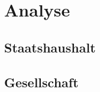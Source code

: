 \documentclass[../main.tex]{subfiles}
\begin{document}
	\section{Analyse}
	
	\subsection{Staatshaushalt}
	
	
	
	\subsection{Gesellschaft}
\end{document}
